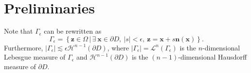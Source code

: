 \documentclass[3p,times]{elsarticle}
\numberwithin{equation}{section}
\begin{document}


\section{Preliminaries}\label{pre}

Note that $\Gamma_{\epsilon}$ can be rewritten as
\begin{equation*}
	\Gamma_{\epsilon}=\left\{\bm z \in \Omega\,\big|\, \exists\  \bm x \in \partial D,\  |s|<\epsilon,\ \bm z =\bm x + s\bm n(\bm x) \right\}.
\end{equation*}
Furthermore, 
$\left|\Gamma_{\epsilon} \right|\lesssim \epsilon\mathcal{H}^{n-1}(\partial D)$,
where $\left|\Gamma_{\epsilon}\right|=\mathcal{L}^n(\Gamma_{\epsilon})$ is the $n$-dimensional Lebesgue measure of $\Gamma_{\epsilon}$ and $\mathcal{H}^{n-1}(\partial D)$ is the $(n-1)$-dimensional Hausdorff measure of $\partial D$. 
\end{document}
